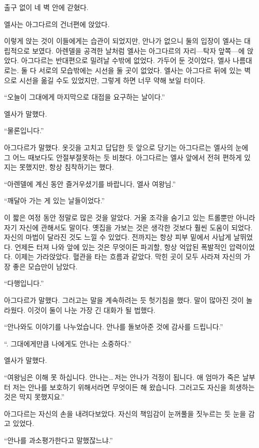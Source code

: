출구 없이 네 벽 안에 갇혔다.

\textbreak

엘사는 아그다르의 건너편에 앉았다.

이렇게 앉는 것이 이들에게는 습관이 되었지만, 안나가 없으니 둘의 입장이 엘사는 대립적으로 보였다. 아렌델을 공격한 날처럼 엘사는 아그다르의 자리—탁자 앞쪽—에 앉았다. 아그다르는 반대편으로 밀려날 수밖에 없었다. 가두어 둔 것이었다, 엘사 나름대로는. 둘 다 서로의 모습밖에는 시선을 둘 곳이 없었다. 엘사는 아그다르 뒤에 있는 벽으로 시선을 옮길 수도 있었지만, 그렇게 하면 너무 약해 보일 터이다.

``오늘이 그대에게 마지막으로 대접을 요구하는 날이다.''

엘사가 말했다.

``물론입니다.''

아그다르가 말했다. 옷깃을 고치고 답답한 듯 앞으로 당기는 아그다르는 엘사의 눈에 그 어느 때보다도 안절부절못하는 듯 비쳤다. 아그다르는 엘사 앞에서 전혀 편하게 있지는 못했지만, 항상 침착하기는 했다.

``아렌델에 계신 동안 즐거우셨기를 바랍니다, 엘사 여왕님.''

``깨달아 가는 게 있는 날들이었다.''

이 짧은 여정 동안 정말로 많은 것을 알았다. 거울 조각을 숨기고 있는 트롤뿐만 아니라 자기 자신에 관해서도 말이다. 옛집을 가보는 것은 생각한 것보다 훨씬 도움이 되었다. 자신의 마법이 달라진 것도 느낄 수 있었다. 전까지는 항상 피부 밑에서 사납게 날뛰었다. 언제든 터져 나와 앞에 있는 것은 무엇이든 파괴할, 항상 억압된 폭발적인 압력이었다. 이제는 가라앉았다. 혈관을 타는 흐름과 같았다. 막힌 곳이 모두 사라져 자신의 가장 좋은 모습만이 남았다.

``다행입니다.''

아그다르가 말했다. 그러고는 말을 계속하려는 듯 헛기침을 했다. 말이 많아진 것이 놀라웠다. 이것이 둘이 나눈 가장 긴 대화가 될 법했다.

``안나와도 이야기를 나누었습니다. 안나를 돌보아준 것에 감사를 드립니다.''

``. 그대에게만큼 나에게도 안나는 소중하다.''

엘사가 말했다.

``여왕님은 이해 못 하십니다. 안나는\ldots\,저는 안나가 걱정이 됩니다. 애 엄마가 죽은 날부터 저는 안나를 보호하기 위해서라면 무엇이든 해 왔습니다. 그러고도 자신을 희생하는 것은 막지 못했지요.''

아그다르는 자신의 손을 내려다보았다. 자신의 책임감이 눈꺼풀을 짓누르는 듯 눈을 감고 있었다.

``안나를 과소평가한다고 말했잖느냐.''

